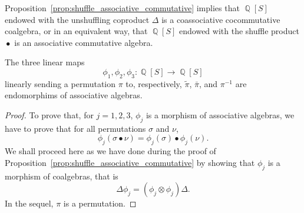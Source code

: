 \documentclass[a4paper,10pt]{llncs}
\DeclareMathOperator{\QQ}{\mathbb{Q}}
\DeclareMathOperator{\SHUFFLE}{\bullet}
\begin{document}
Proposition~\ref{prop:shuffle_associative_commutative} implies that
$\QQ[S]$ endowed with the unshuffling coproduct $\Delta$ is a
coassociative cocommutative coalgebra, or in an equivalent way, that
$\QQ[S]$ endowed with the shuffle product $\SHUFFLE$ is an associative
commutative algebra.
\medskip

\begin{proposition} \label{prop:endomorphisms}
    The three linear maps
    \begin{equation}
        \phi_1, \phi_2, \phi_3 : \QQ[S] \to \QQ[S]
    \end{equation}
    linearly sending a permutation $\pi$ to, respectively,
    $\widetilde{\pi}$, $\bar \pi$, and $\pi^{-1}$ are endomorphims of
    associative algebras.
\end{proposition}
\begin{proof}
    To prove that, for $j = 1, 2, 3$, $\phi_j$ is a morphism of
    associative algebras, we have to prove that for all permutations
    $\sigma$ and $\nu$,
    \begin{equation}
        \phi_j(\sigma \SHUFFLE \nu) =
        \phi_j(\sigma) \SHUFFLE \phi_j(\nu).
    \end{equation}
    We shall proceed here as we have done during the proof of
    Proposition~\ref{prop:shuffle_associative_commutative} by showing
    that $\phi_j$ is a morphism of coalgebras, that is
    \begin{equation}
        \Delta \phi_j = (\phi_j \otimes \phi_j) \Delta.
    \end{equation}
    In the sequel, $\pi$ is a permutation.
    \smallskip


\end{proof}
\end{document}
